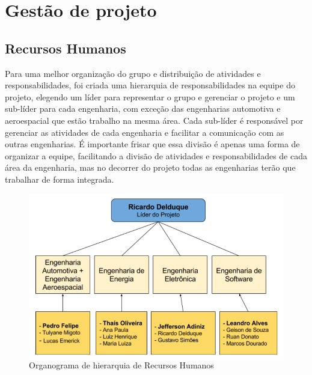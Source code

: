\chapter[Gestão de projeto]{Gestão de projeto}

\section{Recursos Humanos}

Para uma melhor organização do grupo e distribuição de atividades e responsabilidades, foi criada uma hierarquia de responsabilidades na equipe do projeto, elegendo um líder para representar o grupo e gerenciar o projeto e um sub-líder para cada engenharia, com exceção das engenharias automotiva e aeroespacial que estão trabalho na mesma área. Cada sub-líder é responsável por gerenciar as atividades de cada engenharia e facilitar a comunicação com as outras engenharias. É importante frisar que essa divisão é apenas uma forma de organizar a equipe, facilitando a divisão de atividades e responsabilidades de cada área da engenharia, mas no decorrer do projeto todas as engenharias terão que trabalhar de forma integrada.

\begin{figure} [!htp]
	\centering
	\includegraphics[scale=0.55]{figuras/rh.png}
	\caption{Organograma de hierarquia de Recursos Humanos}
	\label{EAP}
\end{figure}


